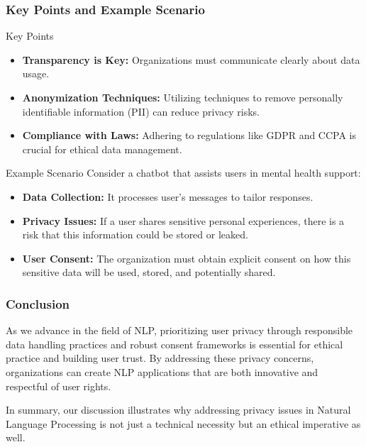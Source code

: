 \documentclass[aspectratio=169]{beamer}
\begin{document}
\begin{frame}[fragile]
    \frametitle{Key Points and Example Scenario}

    \begin{block}{Key Points}
        \begin{itemize}
            \item \textbf{Transparency is Key:} Organizations must communicate clearly about data usage.
            \item \textbf{Anonymization Techniques:} Utilizing techniques to remove personally identifiable information (PII) can reduce privacy risks.
            \item \textbf{Compliance with Laws:} Adhering to regulations like GDPR and CCPA is crucial for ethical data management.
        \end{itemize}
    \end{block}

    \begin{block}{Example Scenario}
        Consider a chatbot that assists users in mental health support:
        \begin{itemize}
            \item \textbf{Data Collection:} It processes user's messages to tailor responses.
            \item \textbf{Privacy Issues:} If a user shares sensitive personal experiences, there is a risk that this information could be stored or leaked.
            \item \textbf{User Consent:} The organization must obtain explicit consent on how this sensitive data will be used, stored, and potentially shared.
        \end{itemize}
    \end{block}
\end{frame}

\begin{frame}[fragile]
    \frametitle{Conclusion}
    As we advance in the field of NLP, prioritizing user privacy through responsible data handling practices and robust consent frameworks is essential for ethical practice and building user trust. 
    By addressing these privacy concerns, organizations can create NLP applications that are both innovative and respectful of user rights.
    
    In summary, our discussion illustrates why addressing privacy issues in Natural Language Processing is not just a technical necessity but an ethical imperative as well.
\end{frame}
\end{document}
